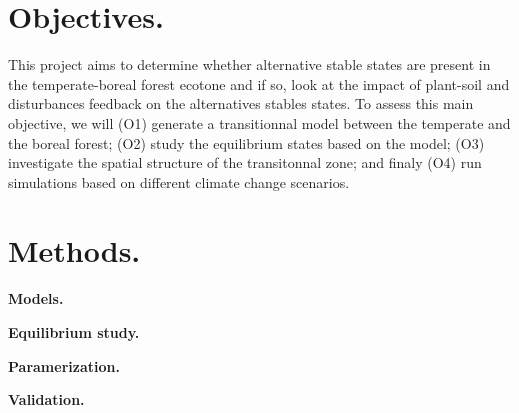 

\section{Objectives.} 

This project aims to determine whether alternative stable states are present in the temperate-boreal forest ecotone and if so, look at the impact of plant-soil and disturbances feedback on the alternatives stables states. To assess this main objective, we will (O1) generate a transitionnal model between the temperate and the boreal forest; (O2) study the equilibrium states based on the model; (O3) investigate the spatial structure of the transitonnal zone; and finaly (O4) run simulations based on different climate change scenarios. \\

\section{Methods.}

\textbf{Models.}

\textbf{Equilibrium study.}

\textbf{Paramerization.} 

\textbf{Validation.}


\newpage


